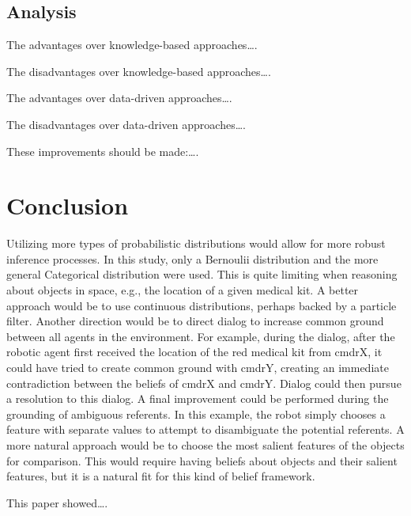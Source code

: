 \documentclass[12pt]{article}
\begin{document}
\subsection{Analysis}
\label{sec:analysis}
The advantages over knowledge-based approaches\dots.

The disadvantages over knowledge-based approaches\dots.

The advantages over data-driven approaches\dots.

The disadvantages over data-driven approaches\dots.

These improvements should be made:\dots.
\section{Conclusion}
\label{sec:conclusion}


Utilizing more types of probabilistic distributions would allow for
more robust inference processes. In this study, only a Bernoulii
distribution and the more general Categorical distribution were
used. This is quite limiting when reasoning about objects in space,
e.g., the location of a given medical kit. A better approach would be
to use continuous distributions, perhaps backed by a particle filter.
Another direction would be to direct dialog to increase common
ground between all agents in the environment. For example, during the
dialog, after the robotic agent first received the location of the
red medical kit from cmdrX, it could have tried to create common
ground with cmdrY, creating an immediate contradiction between the
beliefs of cmdrX and cmdrY. Dialog could then pursue a resolution to
this dialog. A final improvement could be performed during the
grounding of ambiguous referents. In this example, the robot simply
chooses a feature with separate values to attempt to disambiguate the
potential referents. A more natural approach would be to choose the
most salient features of the objects for comparison. This would
require having beliefs about objects and their salient features, but
it is a natural fit for this kind of belief framework.

This paper showed\dots.
 {\small }
\end{document}

